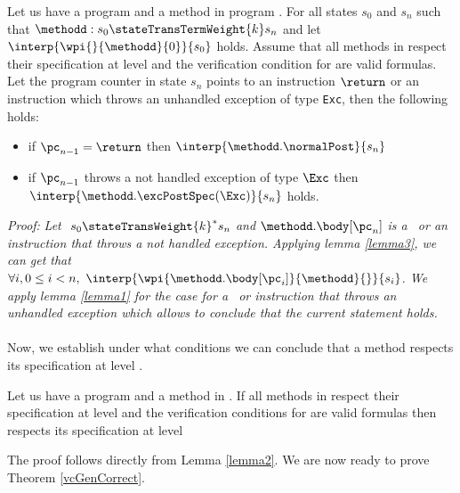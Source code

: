 \begin{lemma}\label{lemma2}
Let us have a program \Program{} and a method \methodd{} in program \Program.
For all states $s_0$ and $s_n$ such that   $\methodd : s_0  \stateTransTermWeight{k} s_n $
and let $\interp{ \wpi{} {\methodd}{0}}{ s_{0}}$ holds. Assume that
  all methods in \Program{} respect their specification at level  and 
the verification condition for \Program{} are valid formulas.
Let the program counter in state $s_n$ points to an instruction $\return $ or
 an instruction which throws an unhandled exception of type \mbox{\rm\texttt{Exc}}, then  the following holds:
\begin{itemize}
    \item if $\pc_{n-1} = \return $     then $\interp{ \methodd.\normalPost}{s_{n}}$

    	\item if $\pc_{n-1}$ throws a not handled exception of type $\Exc$  then  $\interp{\methodd.\excPostSpec( \Exc)}{ s_{n} } $ holds.
	

\end{itemize}
\end{lemma}
\textit{Proof:} 
\textit{Let $ \ s_{0} \stateTransWeight{k}^{*} s_n $ and $\methodd.\body[\pc_n]$ is a \return \ or an instruction that throws a  not handled exception.
 Applying lemma \ref{lemma3}, we can get that $\forall i, 0 \le i < n , \ \interp{ \wpi{\methodd.\body[\pc_i] } {\methodd}{ } }{ s_{i}}$. 
We apply lemma \ref{lemma1} for the case for a \return \ or instruction that throws an unhandled exception which allows to conclude that the current statement holds.
}\\
\Qed\\

Now, we establish under what conditions we can conclude that a method respects its specification at level .
\begin{lemma}\label{lemmaMethRespSpec}
Let us have a program \Program{} and a method \methodd{} in \Program.
If  all methods in \Program{} respect their specification at level   and 
 the verification conditions for \Program{} are valid formulas
then \methodd{}  respects its specification at level  
\end{lemma}
 The proof  follows directly from Lemma \ref{lemma2}. We are now ready to prove Theorem \ref{vcGenCorrect}.


